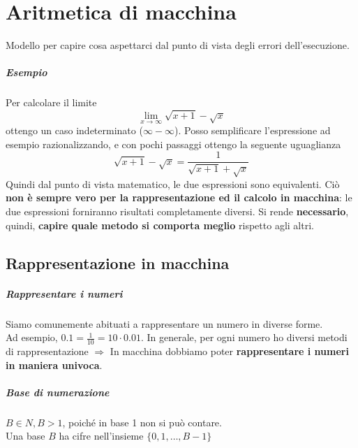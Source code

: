 \documentclass[10pt]{book}
\begin{document}
\chapter{Aritmetica di macchina}
Modello per capire cosa aspettarci dal punto di vista degli errori dell'esecuzione.
\paragraph{Esempio} Per calcolare il limite $$\lim_{x\to\infty} \sqrt{x + 1} - \sqrt{x}$$ ottengo un caso indeterminato ($\infty - \infty$). Posso semplificare l'espressione ad esempio razionalizzando, e con pochi passaggi ottengo la seguente uguaglianza $$\sqrt{x + 1} - \sqrt{x} = \frac{1}{\sqrt{x + 1} + \sqrt{x}}$$ Quindi dal punto di vista matematico, le due espressioni sono equivalenti. Ciò \textbf{non è sempre vero per la rappresentazione ed il calcolo in macchina}: le due espressioni forniranno risultati completamente diversi. Si rende \textbf{necessario}, quindi, \textbf{capire quale metodo si comporta meglio} rispetto agli altri.
\section{Rappresentazione in macchina}
\paragraph{Rappresentare i numeri} Siamo comunemente abituati a rappresentare un numero in diverse forme.\\
Ad esempio, $0.1 = \frac{1}{10} = 10 \cdot 0.01$. In generale, per ogni numero ho diversi metodi di rappresentazione $\Rightarrow$ In macchina dobbiamo poter \textbf{rappresentare i numeri in maniera univoca}.
\paragraph{Base di numerazione} $B \in N, B > 1$, poiché in base 1 non si può contare.\\Una base $B$ ha cifre nell'insieme $\{0, 1, \ldots, B - 1\}$
\end{document}
